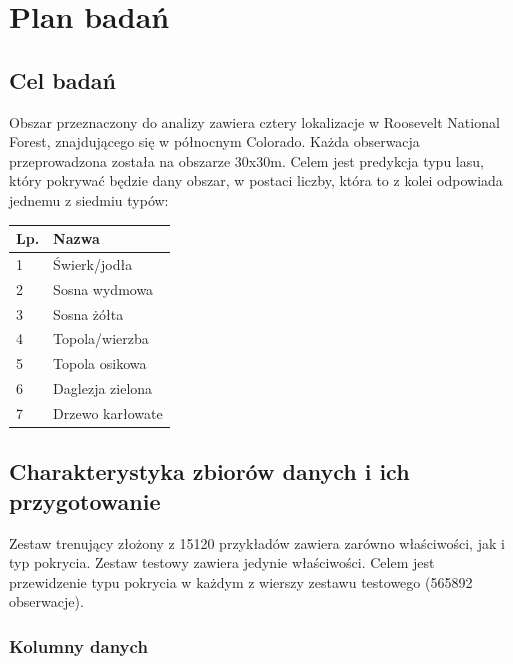 \documentclass[11pt]{article} %
\begin{document}
\section{Plan badań}

\subsection{Cel badań}

Obszar przeznaczony do analizy zawiera cztery lokalizacje w Roosevelt National Forest, znajdującego się w północnym Colorado. Każda obserwacja przeprowadzona została na obszarze 30x30m. Celem jest predykcja typu lasu, który pokrywać będzie dany obszar, w postaci liczby, która to z kolei odpowiada jednemu z siedmiu typów:

\begin{center}
    \begin{tabular}{ | l | l | }
    \hline
    	Lp. & Nazwa \\ \hline
    	1 &Świerk/jodła \\
	2 & Sosna wydmowa \\
	3 & Sosna żółta \\
	4 & Topola/wierzba \\
	5 & Topola osikowa \\
	6 & Daglezja zielona \\
	7 & Drzewo karłowate \\ \hline
    \end{tabular}
\end{center}

\subsection{Charakterystyka zbiorów danych i ich przygotowanie}

Zestaw trenujący złożony z 15120 przykładów zawiera zarówno właściwości, jak i typ pokrycia. Zestaw testowy zawiera jedynie właściwości. Celem jest przewidzenie typu pokrycia w każdym z wierszy zestawu testowego (565892 obserwacje).

\subsubsection{Kolumny danych}
\end{document}
